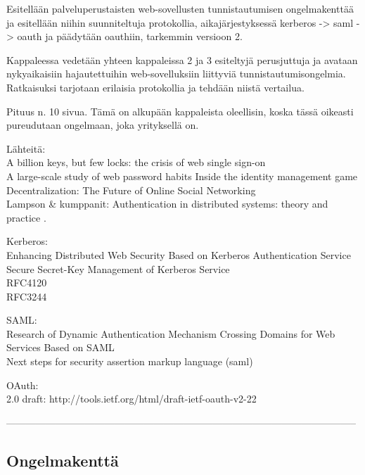 Esitellään palveluperustaisten web-sovellusten tunnistautumisen ongelmakenttää ja esitellään niihin suunniteltuja protokollia, aikajärjestyksessä kerberos -> saml -> oauth ja päädytään oauthiin, tarkemmin versioon 2.

Kappaleessa vedetään yhteen kappaleissa 2 ja 3 esiteltyjä perusjuttuja ja avataan nykyaikaisiin hajautettuihin web-sovelluksiin liittyviä tunnistautumisongelmia. Ratkaisuksi tarjotaan erilaisia protokollia ja tehdään niistä vertailua.

Pituus n. 10 sivua. Tämä on alkupään kappaleista oleellisin, koska tässä oikeasti pureudutaan ongelmaan, joka yrityksellä on.

Lähteitä:\\
A billion keys, but few locks: the crisis of web single sign-on \cite{billion_keys}\\
A large-scale study of web password habits \cite{password_habits}
Inside the identity management game \cite{inside_the_identity_management_game}\\
Decentralization: The Future of Online Social Networking \cite{decentralisations}\\
Lampson \& kumppanit: Authentication in distributed systems: theory and practice \cite{lampson}.

Kerberos:\\
Enhancing Distributed Web Security Based on Kerberos Authentication Service \cite{enchancing_distributed_web_security}\\
Secure Secret-Key Management of Kerberos Service \cite{secure_secret_key}\\
RFC4120 \cite{rfc4120}\\
RFC3244 \cite{rfc3244}

SAML:\\
Research of Dynamic Authentication Mechanism Crossing Domains for Web Services Based on SAML \cite{dynamic_saml}\\
Next steps for security assertion markup language (saml) \cite{next_saml}

OAuth:\\
2.0 draft: http://tools.ietf.org/html/draft-ietf-oauth-v2-22 \cite{oauth2_0}

-----------------------------------------------------------------------------------------------------------


\subsection{Ongelmakenttä}

